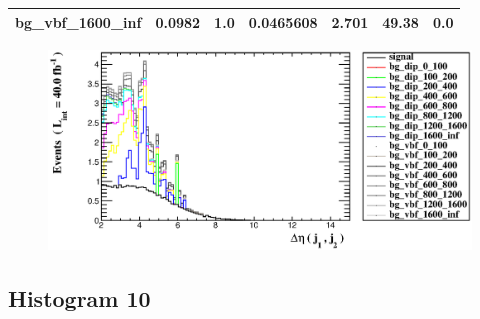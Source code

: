 \documentclass[a4paper, 10pt]{article}
\begin{document}
\begin{table}[H]
\begin{center}
\begin{tabular}{|m{23.0mm}|m{23.0mm}|m{18.0mm}|m{19.0mm}|m{19.0mm}|m{19.0mm}|m{19.0mm}|}
      \hline
      {\cellcolor{white}         bg\_vbf\_1600\_inf}& {\cellcolor{white}         0.0982}& {\cellcolor{white}         1.0}& {\cellcolor{white}         0.0465608}& {\cellcolor{white}         2.701}& {\cellcolor{red}         49.38}& {\cellcolor{red}         0.0}\\
\hline
    \end{tabular}
  \end{center}
\end{table}

\begin{figure}[H]
  \begin{center}
    \includegraphics[scale=0.45]{selection_8.eps}\\
\caption{   }
  \end{center}
\end{figure}
      \newpage
\subsection{ Histogram 10}
\end{document}
